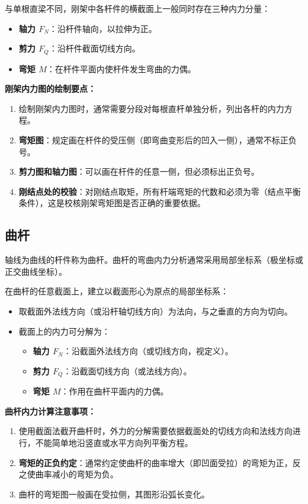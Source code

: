 与单根直梁不同，刚架中各杆件的横截面上一般同时存在三种内力分量：
\begin{itemize}
    \item \textbf{轴力 \(F_N\)}：沿杆件轴向，以拉伸为正。
    \item \textbf{剪力 \(F_Q\)}：沿杆件截面切线方向。
    \item \textbf{弯矩 \(M\)}：在杆件平面内使杆件发生弯曲的力偶。
\end{itemize}

\textbf{刚架内力图的绘制要点：}
\begin{enumerate}
    \item 绘制刚架内力图时，通常需要分段对每根直杆单独分析，列出各杆的内力方程。
    \item \textbf{弯矩图}：规定画在杆件的受压侧（即弯曲变形后的凹入一侧），通常不标正负号。
    \item \textbf{剪力图和轴力图}：可以画在杆件的任意一侧，但必须标出正负号。
    \item \textbf{刚结点处的校验}：对刚结点取矩，所有杆端弯矩的代数和必须为零（结点平衡条件），这是校核刚架弯矩图是否正确的重要依据。
\end{enumerate}

\subsection*{曲杆}
轴线为曲线的杆件称为曲杆。曲杆的弯曲内力分析通常采用局部坐标系（极坐标或正交曲线坐标）。

在曲杆的任意截面上，建立以截面形心为原点的局部坐标系：
\begin{itemize}
    \item 取截面外法线方向（或沿杆轴切线方向）为法向，与之垂直的方向为切向。
    \item 截面上的内力可分解为：
    \begin{itemize}
        \item \textbf{轴力 \(F_N\)}：沿截面外法线方向（或切线方向，视定义）。
        \item \textbf{剪力 \(F_Q\)}：沿截面切线方向（或法线方向）。
        \item \textbf{弯矩 \(M\)}：作用在曲杆平面内的力偶。
    \end{itemize}
\end{itemize}

\textbf{曲杆内力计算注意事项：}
\begin{enumerate}
    \item 使用截面法截开曲杆时，外力的分解需要依据截面处的切线方向和法线方向进行，不能简单地沿竖直或水平方向列平衡方程。
    \item \textbf{弯矩的正负约定}：通常约定使曲杆的曲率增大（即凹面受拉）的弯矩为正，反之使曲率减小的弯矩为负。
    \item 曲杆的弯矩图一般画在受拉侧，其图形沿弧长变化。
\end{enumerate}

